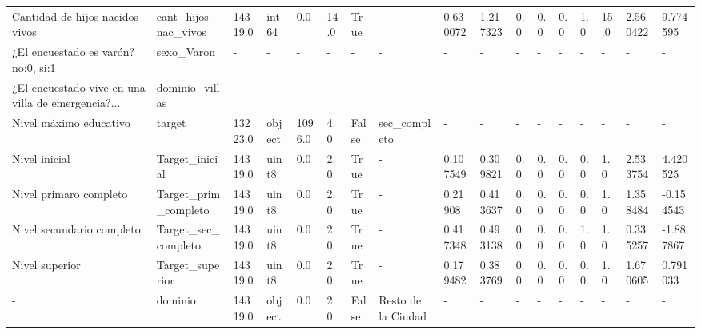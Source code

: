\documentclass[a4paper]{article}
\begin{document}
\begin{landscape}
{\begin{tabular}{lllllllllllllllll}
        Cantidad de hijos nacidos vivos                    &         cant\_hijos\_nac\_vivos &  14319.0 &    int64 &     0.0 &    14.0 &    True &                              - &      0.630072 &      1.217323 &  0.0 &      0.0 &      0.0 &      1.0 &       15.0 &   2.560422 &    9.774595 \\
        ¿El encuestado es varón? no:0, si:1                &                   sexo\_Varon &        - &        - &       - &       - &       - &                              - &             - &             - &    - &        - &        - &        - &          - &          - &           - \\
        ¿El encuestado vive en una villa de emergencia?... &               dominio\_villas &        - &        - &       - &       - &       - &                              - &             - &             - &    - &        - &        - &        - &          - &          - &           - \\
        Nivel máximo educativo                             &                       target &  13223.0 &   object &  1096.0 &     4.0 &   False &                   sec\_completo &             - &             - &    - &        - &        - &        - &          - &          - &           - \\
        Nivel inicial                                      &               Target\_inicial &  14319.0 &    uint8 &     0.0 &     2.0 &    True &                              - &      0.107549 &      0.309821 &  0.0 &      0.0 &      0.0 &      0.0 &        1.0 &   2.533754 &    4.420525 \\
        Nivel primaro completo                             &         Target\_prim\_completo &  14319.0 &    uint8 &     0.0 &     2.0 &    True &                              - &       0.21908 &      0.413637 &  0.0 &      0.0 &      0.0 &      0.0 &        1.0 &   1.358484 &   -0.154543 \\
        Nivel secundario completo                          &          Target\_sec\_completo &  14319.0 &    uint8 &     0.0 &     2.0 &    True &                              - &      0.417348 &      0.493138 &  0.0 &      0.0 &      0.0 &      1.0 &        1.0 &   0.335257 &   -1.887867 \\
        Nivel superior                                     &              Target\_superior &  14319.0 &    uint8 &     0.0 &     2.0 &    True &                              - &      0.179482 &      0.383769 &  0.0 &      0.0 &      0.0 &      0.0 &        1.0 &   1.670605 &    0.791033 \\
        -                                                  &                      dominio &  14319.0 &   object &     0.0 &     2.0 &   False &             Resto de la Ciudad &             - &             - &    - &        - &        - &        - &          - &          - &           - \\
        \bottomrule
    \end{tabular} }
    \end{landscape}
               
\end{document}

